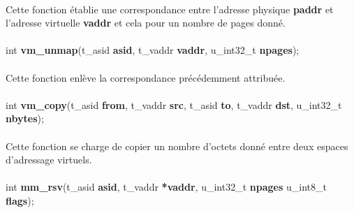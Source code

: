 \documentclass[10pt,a4wide]{article}
\begin{document}
\paragraph{}

Cette fonction \'etablie une correspondance entre l'adresse physique
\textbf{paddr} et l'adresse virtuelle \textbf{vaddr} et cela pour
un nombre de pages donn\'e.

\paragraph{}

\hspace{1.5cm}int \textbf{vm\_unmap}(t\_asid \textbf{asid},
                                     t\_vaddr \textbf{vaddr},
                                     u\_int32\_t \textbf{npages});

\paragraph{}

Cette fonction enl\`eve la correspondance pr\'ec\'edemment
attribu\'ee.

\paragraph{}

\hspace{1.5cm}int \textbf{vm\_copy}(t\_asid \textbf{from},
                                    t\_vaddr \textbf{src},
                                    t\_asid \textbf{to},
                                    t\_vaddr \textbf{dst},
                                    u\_int32\_t \textbf{nbytes});

\paragraph{}

Cette fonction se charge de copier un nombre d'octets donn\'e entre
deux espaces d'adressage virtuels.

\paragraph{}

\hspace{1.5cm}int \textbf{mm\_rsv}(t\_asid \textbf{asid},
                                   t\_vaddr \textbf{*vaddr},
                                   u\_int32\_t \textbf{npages}
                                   u\_int8\_t \textbf{flags});
\end{document}
